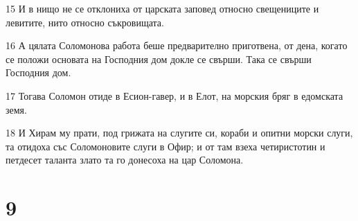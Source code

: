 \par 15 И в нищо не се отклониха от царската заповед относно свещениците и левитите, нито относно съкровищата.
\par 16 А цялата Соломонова работа беше предварително приготвена, от дена, когато се положи основата на Господния дом докле се свърши. Така се свърши Господния дом.
\par 17 Тогава Соломон отиде в Есион-гавер, и в Елот, на морския бряг в едомската земя.
\par 18 И Хирам му прати, под грижата на слугите си, кораби и опитни морски слуги, та отидоха със Соломоновите слуги в Офир; и от там взеха четиристотин и петдесет таланта злато та го донесоха на цар Соломона.

\chapter{9}

